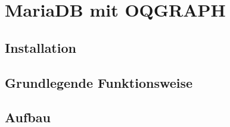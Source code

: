 \chapter{MariaDB mit OQGRAPH}
\section{Installation}
\section{Grundlegende Funktionsweise}
\section{Aufbau}
